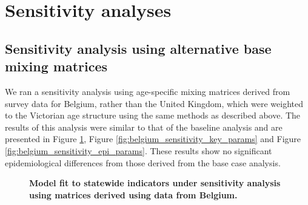 
\section{Sensitivity analyses}
\subsection{Sensitivity analysis using alternative base mixing matrices}
We ran a sensitivity analysis using age-specific mixing matrices derived from survey data for Belgium, rather than the United Kingdom, which were weighted to the Victorian age structure using the same methods as described above. The results of this analysis were similar to that of the baseline analysis and are presented in Figure \ref{fig:belgium_sensitivity_outputs}, Figure \ref{fig:belgium_sensitivity_key_params} and Figure \ref{fig:belgium_sensitivity_epi_params}. These results show no significant epidemiological differences from those derived from the base case analysis.

\begin{figure}[ht]
    \caption{\textbf{Model fit to statewide indicators under sensitivity analysis using matrices derived using data from Belgium.}}
    \label{fig:belgium_sensitivity_outputs}
\end{figure}

